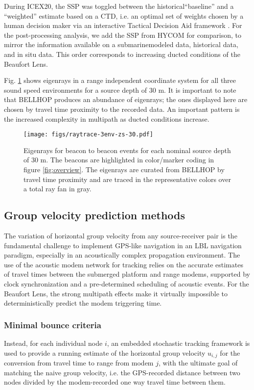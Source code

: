 During ICEX20, the SSP was toggled between the historical``baseline'' and a ``weighted'' estimate based on a CTD, i.e. an optimal set of weights chosen by a human decision maker via an interactive Tactical Decision Aid framework \citep{bhatt_embedded_2021}.
For the post-processing analysis, we add the SSP from HYCOM for comparison, to mirror the information available on a submarine\textemdash modeled data, historical data, and in situ data.
This order corresponds to increasing ducted conditions of the Beaufort Lens.

Fig. \ref{fig:raytrace-zs30} shows eigenrays in a range independent coordinate system for all three sound speed environments for a source depth of 30 m.
It is important to note that BELLHOP produces an abundance of eigenrays; the ones displayed here are chosen by travel time proximity to the recorded data.
An important pattern is the increased complexity in multipath as ducted conditions increase.

\begin{figure}[h!]
  \centering
  \texttt{[image: figs/raytrace-3env-zs-30.pdf]}
  \caption{Eigenrays for beacon to beacon events for each nominal source depth of 30 m. The beacons are highlighted in color/marker coding in figure \ref{fig:overview}. The eigenrays are curated from BELLHOP by travel time proximity and are traced in the representative colors over a total ray fan in gray.}
  \label{fig:raytrace-zs30}
  \end{figure}

\FloatBarrier
\subsection{Group velocity prediction methods}

The variation of horizontal group velocity from any source-receiver pair is the fundamental challenge to implement GPS-like navigation in an LBL navigation paradigm, especially in an acoustically complex propagation environment.
The use of the acoustic modem network for tracking relies on the accurate estimates of travel times between the submerged platform and range modems, supported by clock synchronization and a pre-determined scheduling of acoustic events.
For the Beaufort Lens, the strong multipath effects make it virtually impossible to deterministically predict the modem triggering time.

\subsubsection{Minimal bounce criteria}
Instead, for each individual node $i$, an embedded stochastic tracking framework is used to provide a running estimate of the horizontal group velocity $u_{i,j}$ for the conversion from travel time to range from modem $j$, with the ultimate goal of matching the naive group velocity, i.e. the GPS-recorded distance between two nodes divided by the modem-recorded one way travel time between them. 

